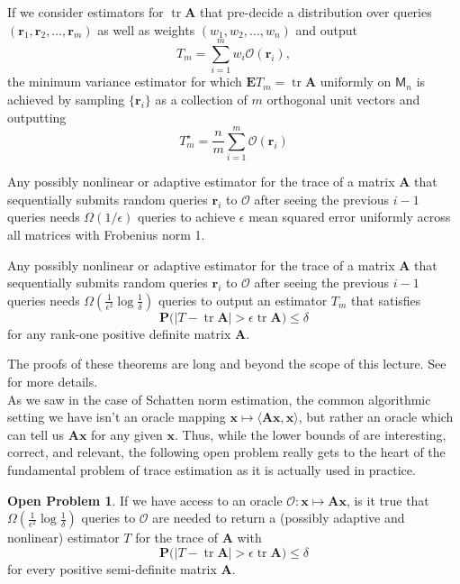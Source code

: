 \documentclass[10pt,letterpaper]{siamart171218}
\theoremstyle{definition}
\newtheorem{openproblem}[theorem]{Open Problem}
\theoremstyle{remark}
\newcommand\inner[1]{\langle #1 \rangle}
\newcommand\M{\mathsf{M}}
\renewcommand\P{\mathbf{P}}
\newcommand\E{\mathbf{E}}
\renewcommand\O{\mathcal{O}}
\newcommand\tr{\operatorname{tr}}
\newcommand\A{\boldsymbol{A}}
\newcommand\x{\boldsymbol{x}}
\renewcommand\r{\boldsymbol{r}}
\begin{document}
\begin{theorem}
    If we consider estimators for $\tr\A$ that pre-decide a distribution
    over queries $(\r_1,\r_2,\ldots,\r_m)$ as well as weights $(w_1,
    w_2,\ldots,w_n)$ and output
    \[
        T_m = \sum_{i=1}^m w_i\O(\r_i),
    \]
    the minimum variance estimator for which
    $\E T_m = \tr\A$ uniformly on $\M_n$ is achieved by sampling
    $\{\r_i\}$ as a collection of $m$ orthogonal unit vectors and outputting
    \[
        T_m^\star = \frac{n}{m}\sum_{i=1}^m \O(\r_i)
    \]
\end{theorem}

\begin{theorem}
    Any possibly nonlinear or adaptive estimator for the trace of a matrix
    $\A$ that sequentially submits random queries $\r_i$ to $\O$ after seeing the previous
    $i-1$ queries needs $\Omega(1/\epsilon)$ queries to achieve $\epsilon$ mean
    squared error uniformly across all matrices with Frobenius norm 1.
\end{theorem}

\begin{theorem}
    Any possibly nonlinear or adaptive estimator for the trace of a matrix
    $\A$ that sequentially submits random queries $\r_i$ to $\O$ after seeing the previous
    $i-1$ queries needs $\Omega(\tfrac{1}{\epsilon^2}\log\tfrac{1}{\delta})$ queries
    to output an estimator $T_m$ that satisfies
    \[
        \P\bigl(|T - \tr\A| > \epsilon\tr\A\bigr) \leq \delta
    \]
    for any rank-one positive definite matrix $\A$.
\end{theorem}

The proofs of these theorems are long and beyond the scope of this lecture. See
\cite{wimmer2014optimal} for more details.\\

As we saw in the case of Schatten norm estimation, the common algorithmic setting
we have isn't an oracle mapping $\x\mapsto \inner{\A\x,\x}$, but rather an oracle
which can tell us $\A\x$ for any given $\x$. Thus, while the lower bounds of
\cite{wimmer2014optimal} are interesting, correct, and relevant, the following open
problem really gets to the heart of the fundamental problem of trace estimation as
it is actually used in practice.

\begin{openproblem}
    If we have access to an oracle $\O : \x \mapsto \A\x$,
    is it true that $\Omega(\tfrac{1}{\epsilon^2}\log\tfrac{1}{\delta})$
    queries to $\O$ are needed to return a (possibly adaptive and nonlinear) estimator
    $T$ for the trace of $\A$ with
    \[
        \P\bigl(|T - \tr\A| > \epsilon\tr\A\bigr) \leq \delta
    \]
    for every positive semi-definite matrix $\A$.
\end{openproblem}



\end{document}
